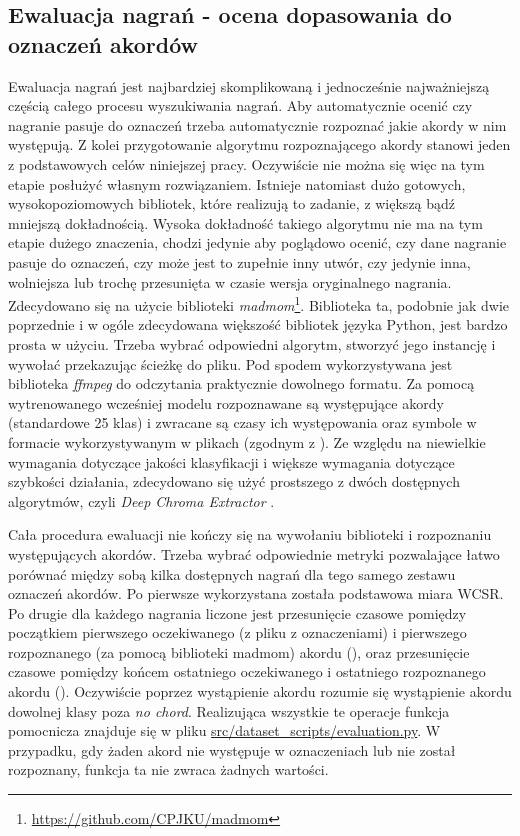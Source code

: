 \subsection{Ewaluacja nagrań - ocena dopasowania do oznaczeń akordów}
Ewaluacja nagrań jest najbardziej skomplikowaną i jednocześnie najważniejszą częścią całego procesu
wyszukiwania nagrań. Aby automatycznie ocenić czy nagranie pasuje do oznaczeń trzeba automatycznie
rozpoznać jakie akordy w nim występują. Z kolei przygotowanie algorytmu rozpoznającego akordy
stanowi jeden z podstawowych celów niniejszej pracy. Oczywiście nie można się więc na tym etapie
posłużyć własnym rozwiązaniem. Istnieje natomiast dużo gotowych, wysokopoziomowych bibliotek, które
realizują to zadanie, z większą bądź mniejszą dokładnością. Wysoka dokładność takiego algorytmu nie
ma na tym etapie dużego znaczenia, chodzi jedynie aby poglądowo ocenić, czy dane nagranie pasuje do
oznaczeń, czy może jest to zupełnie inny utwór, czy jedynie inna, wolniejsza lub trochę przesunięta
w czasie wersja oryginalnego nagrania. Zdecydowano się na użycie biblioteki
\emph{madmom}\footnote{\url{https://github.com/CPJKU/madmom}}.
Biblioteka ta, podobnie jak dwie poprzednie i w ogóle zdecydowana większość bibliotek języka Python,
jest bardzo prosta w użyciu. Trzeba wybrać odpowiedni algorytm, stworzyć jego instancję i wywołać
przekazując ścieżkę do pliku. Pod spodem wykorzystywana jest biblioteka \emph{ffmpeg} do odczytania
praktycznie dowolnego formatu. Za pomocą wytrenowanego wcześniej modelu rozpoznawane są występujące
akordy (standardowe 25 klas) i zwracane są czasy ich występowania oraz symbole w formacie
wykorzystywanym w plikach  (zgodnym z \cite{harte_towards_nodate}). Ze względu na
niewielkie wymagania dotyczące jakości klasyfikacji i większe wymagania dotyczące szybkości
działania, zdecydowano się użyć prostszego z dwóch dostępnych algorytmów, czyli \emph{Deep Chroma
Extractor} \cite{korzeniowski_feature_2016}.

Cała procedura ewaluacji nie kończy się na wywołaniu biblioteki i rozpoznaniu występujących akordów.
Trzeba wybrać odpowiednie metryki pozwalające łatwo porównać między sobą kilka dostępnych nagrań dla
tego samego zestawu oznaczeń akordów. Po pierwsze wykorzystana została podstawowa miara WCSR. Po drugie
dla każdego nagrania liczone jest przesunięcie czasowe pomiędzy początkiem pierwszego oczekiwanego
(z pliku z oznaczeniami) i pierwszego rozpoznanego (za pomocą biblioteki madmom) akordu
(), oraz przesunięcie czasowe pomiędzy końcem ostatniego oczekiwanego i ostatniego
rozpoznanego akordu (). Oczywiście poprzez wystąpienie akordu rozumie się
wystąpienie akordu dowolnej klasy poza \emph{no chord}. Realizująca wszystkie te operacje funkcja
pomocnicza znajduje się w pliku \url{src/dataset_scripts/evaluation.py}. W przypadku, gdy żaden akord
nie występuje w oznaczeniach lub nie został rozpoznany, funkcja ta nie zwraca żadnych wartości.

